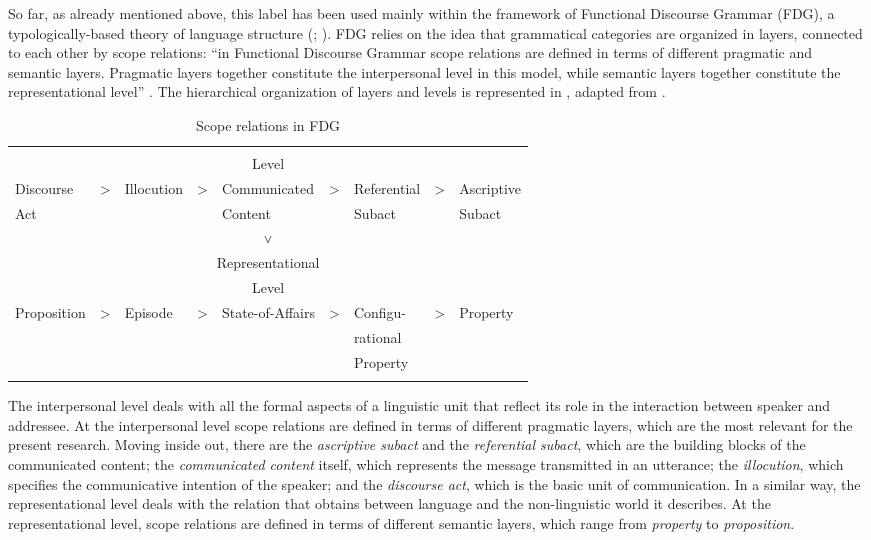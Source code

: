 So far, as already mentioned above, this label has been used mainly within the framework of Functional Discourse Grammar (FDG), a typologically-based theory of language structure (\citealt{HengeveldMackenzie2008}; \citealt{Keizer2015}). FDG relies on the idea that grammatical categories are organized in layers, connected to each other by scope relations: “in Functional Discourse Grammar scope relations are defined in terms of different pragmatic and semantic layers. Pragmatic layers together constitute the interpersonal level in this model, while semantic layers together constitute the representational level” \citep[15]{Hengeveld2017}. The hierarchical organization of layers and levels is represented in , adapted from \citet[16]{Hengeveld2017}.

\begin{table}
\footnotesize
\begin{tabular}{lclclclcl}
\lsptoprule
\multicolumn{9}{c}{Interpersonal}\\
\multicolumn{9}{c}{Level}\\
\midrule
Discourse & > & Illocution & > & Communicated & > & Referential & > & Ascriptive\\
Act & & & & Content & & Subact & & Subact \\
\multicolumn{9}{c}{˅}\\
\multicolumn{9}{c}{Representational}\\
\multicolumn{9}{c}{Level}\\
\midrule
Proposition & > & Episode & > & State-of-Affairs & > & Configu-& > & Property\\
& & & & & & rational & & \\
& & & & & & Property & & \\
\lspbottomrule
\end{tabular}
\caption{\label{tab:key:3.1} Scope relations in FDG}
\end{table}

The interpersonal level deals with all the formal aspects of a linguistic unit that reflect its role in the interaction between speaker and addressee. At the interpersonal level scope relations are defined in terms of different pragmatic layers, which are the most relevant for the present research. Moving inside out, there are the \textit{ascriptive subact} and the \textit{referential subact}, which are the building blocks of the communicated content; the \textit{communicated content} itself, which represents the message transmitted in an utterance; the \textit{illocution}, which specifies the communicative intention of the speaker; and the \textit{discourse act}, which is the basic unit of communication. In a similar way, the representational level deals with the relation that obtains between language and the non-linguistic world it describes. At the representational level, scope relations are defined in terms of different semantic layers, which range from \textit{property} to \textit{proposition}.

